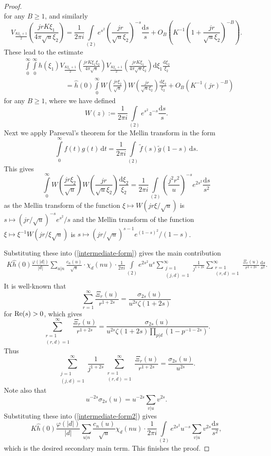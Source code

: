 \documentclass[a4paper,10pt,twoside]{amsart}
\theoremstyle{definition}
\numberwithin{equation}{section}
\renewcommand{\Re}{\textnormal{Re}}
\renewcommand\:{\colon}
\begin{document}
\begin{proof}
\[\]
for any $B\geq 1$, and similarly
\[
V_{\frac{K\xi_1+1}2}\left(\frac{jrK\xi_1}{4\pi\sqrt u\xi_2}\right)=\frac1{2\pi i}\int\limits_{(2)}e^{s^2}\left(\frac{jr}{\sqrt u \xi_2}\right)^{-s}\frac{\mathrm d s}s+O_B\left(K^{-1}\left(1+\frac{jr}{\sqrt u \xi_2}\right)^{-B} \right).
\]
These lead to the estimate
\begin{align*}
&\int\limits_0^\infty\int\limits_0^\infty h\left(\xi_1\right)V_{\frac{K\xi_1+1}2}\left(\frac{jrK\xi_1\xi_2}{4\pi\sqrt u}\right)V_{\frac{K\xi_1+1}2}\left(\frac{jrK\xi_1}{4\pi\sqrt u\xi_2}\right)\mathrm d \xi_1\frac{\mathrm d \xi_2}{\xi_2}\\
&\qquad\qquad\qquad=\widehat h(0)\int\limits_0^\infty W\left(\frac{jr\xi_2}{\sqrt u}\right)W\left(\frac{jr}{\sqrt u \xi_2}\right)\frac{\mathrm d \xi_2}{\xi_2}+O_B\left(K^{-1}(jr)^{-B}\right)
\end{align*}
for any $B\geq 1$, where we have defined 
\[
W(z):=\frac1{2\pi i}\int\limits_{(2)}e^{s^2}z^{-s}\frac{\mathrm d s}{s}. 
\]
Next we apply Parseval's theorem for the Mellin transform in the form
\[
\int\limits_0^\infty f(t)g(t)\,\mathrm d t=\frac1{2\pi i}\int\limits_{(2)}\widetilde f(s)\widetilde g(1-s)\,\mathrm d s. 
\]
This gives 
\[
\int\limits_0^\infty W\left(\frac{jr\xi_2}{\sqrt u}\right)W\left(\frac{jr}{\sqrt u \xi_2}\right)\frac{\mathrm d \xi_2}{\xi_2}=\frac1{2\pi i}\int\limits_{(2)}\left(\frac{j^2r^2}u\right)^{-s}e^{2s^2}\frac{\mathrm d s}{s^2}
\]
as the Mellin transform of the function $\xi\mapsto W(jr\xi/\sqrt u)$ is $s\mapsto (jr/\sqrt u)^{-s}e^{s^2}/s$ and the Mellin transform of the function $\xi\mapsto \xi^{-1}W(jr/\xi\sqrt u)$ is $s\mapsto (jr/\sqrt u)^{s-1}e^{(1-s)^2}/(1-s)$.

Substituting these into (\ref{intermediate-form}) gives the main contribution
\begin{align}\label{intermediate-form2}
K\widehat h(0)\frac{\varphi(|d|)}{|d|}\sum_{u|n}\frac{c_n(u)}{\sqrt u}\cdot\chi_d(nu)\cdot\frac1{2\pi i}\int\limits_{(2)}e^{2s^2}u^s\sum_{\substack{j=1\\
(j,d)=1}}^\infty\frac1{j^{1+2s}}\sum_{\substack{r=1\\
(r,d)=1}}^\infty\frac{\Xi_r(u)}{r^{1+2s}}\frac{\mathrm d s}{s^2}.
\end{align}
It is well-known that
\[
\sum_{r=1}^\infty\frac{\Xi_r(u)}{r^{1+2s}}=\frac{\sigma_{2s}(u)}{u^{2s}\zeta(1+2s)}
\]
for $\Re(s)>0$, which gives
\[
\sum_{\substack{r=1\\
(r,d)=1}}^\infty\frac{\Xi_r(u)}{r^{1+2s}}=\frac{\sigma_{2s}(u)}{u^{2s}\zeta(1+2s)\prod_{p|d}\left(1-p^{-1-2s}\right)}.
\]
Thus
\[
\sum_{\substack{j=1\\
(j,d)=1}}^\infty\frac1{j^{1+2s}}\sum_{\substack{r=1\\
(r,d)=1}}^\infty\frac{\Xi_r(u)}{r^{1+2s}}=\frac{\sigma_{2s}(u)}{u^{2s}}. 
\]
Note also that
\[
u^{-2s}\sigma_{2s}(u)=u^{-2s}\sum_{v|u}v^{2s}.
\]
Substituting these into (\ref{intermediate-form2}) gives
\[
K\widehat h(0)\frac{\varphi(|d|)}{|d|}\sum_{u|n}\frac{c_n(u)}{\sqrt u}\chi_d(nu)\cdot\frac1{2\pi i}\int\limits_{(2)}e^{2s^2}u^{-s}\sum_{v|u}v^{2s}\frac{\mathrm d s}{s^2},
\]
which is the desired secondary main term. This finishes the proof.  
\end{proof}
\end{document}
